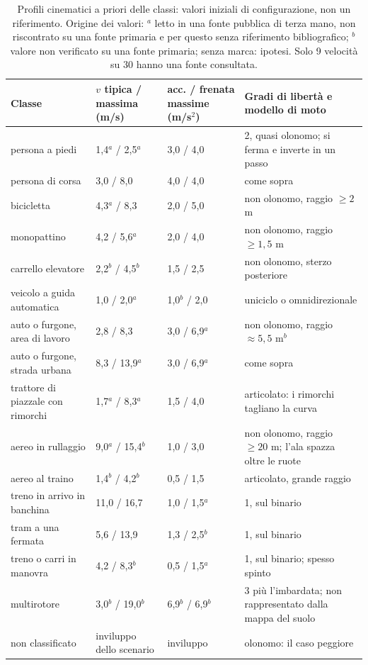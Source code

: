 \begin{table}[!htb]\centering\footnotesize
\caption{Profili cinematici a priori delle classi: valori iniziali di configurazione, non un riferimento. Origine dei valori: $^{a}$ letto in una fonte pubblica di terza mano, non riscontrato su una fonte primaria e per questo senza riferimento bibliografico; $^{b}$ valore non verificato su una fonte primaria; senza marca: ipotesi. Solo 9 velocità su 30 hanno una fonte consultata.}\label{tab:sti-profili}
\begin{tabularx}{\linewidth}{@{}p{4.6cm}p{2.0cm}p{2.0cm}L@{}}
\toprule
Classe & $v$ tipica / massima (m/s) & acc. / frenata massime (m/s$^2$) & Gradi di libertà e modello di moto\\
\midrule
persona a piedi & 1,4$^{a}$ / 2,5$^{a}$ & 3,0 / 4,0 & 2, quasi olonomo; si ferma e inverte in un passo\\
persona di corsa & 3,0 / 8,0 & 4,0 / 4,0 & come sopra\\
bicicletta & 4,3$^{a}$ / 8,3 & 2,0 / 5,0 & non olonomo, raggio $\ge2$ m\\
monopattino & 4,2 / 5,6$^{a}$ & 2,0 / 4,0 & non olonomo, raggio $\ge1{,}5$ m\\
carrello elevatore & 2,2$^{b}$ / 4,5$^{b}$ & 1,5 / 2,5 & non olonomo, sterzo posteriore\\
veicolo a guida automatica & 1,0 / 2,0$^{a}$ & 1,0$^{b}$ / 2,0 & uniciclo o omnidirezionale\\
auto o furgone, area di lavoro & 2,8 / 8,3 & 3,0 / 6,9$^{a}$ & non olonomo, raggio $\approx5{,}5$ m$^{b}$\\
auto o furgone, strada urbana & 8,3 / 13,9$^{a}$ & 3,0 / 6,9$^{a}$ & come sopra\\
trattore di piazzale con rimorchi & 1,7$^{a}$ / 8,3$^{a}$ & 1,5 / 4,0 & articolato: i rimorchi tagliano la curva\\
aereo in rullaggio & 9,0$^{a}$ / 15,4$^{b}$ & 1,0 / 3,0 & non olonomo, raggio $\ge20$ m; l'ala spazza oltre le ruote\\
aereo al traino & 1,4$^{b}$ / 4,2$^{b}$ & 0,5 / 1,5 & articolato, grande raggio\\
treno in arrivo in banchina & 11,0 / 16,7 & 1,0 / 1,5$^{a}$ & 1, sul binario\\
tram a una fermata & 5,6 / 13,9 & 1,3 / 2,5$^{b}$ & 1, sul binario\\
treno o carri in manovra & 4,2 / 8,3$^{b}$ & 0,5 / 1,5$^{a}$ & 1, sul binario; spesso spinto\\
multirotore & 3,0$^{b}$ / 19,0$^{b}$ & 6,9$^{b}$ / 6,9$^{b}$ & 3 più l'imbardata; non rappresentato dalla mappa del suolo\\
non classificato & inviluppo dello scenario & inviluppo & olonomo: il caso peggiore\\
\bottomrule
\end{tabularx}
\end{table}
